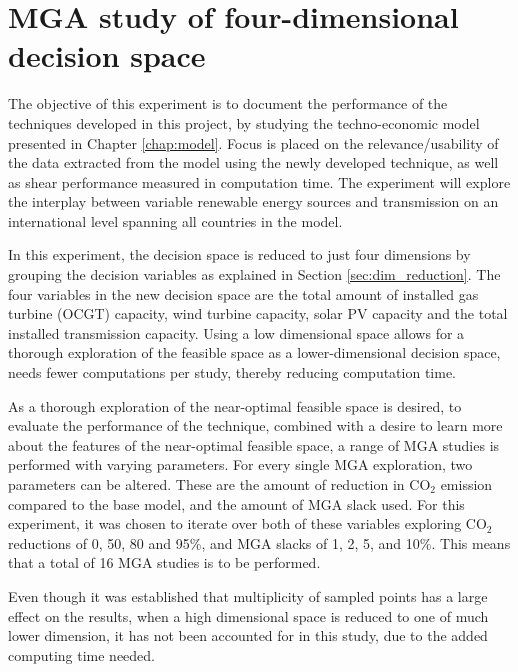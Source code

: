 \section{MGA study of four-dimensional decision space}\label{sec:4D}
The objective of this experiment is to document the performance of the techniques developed in this project, by studying the techno-economic model presented in Chapter \ref{chap:model}. Focus is placed on the relevance/usability of the data extracted from the model using the newly developed technique, as well as shear performance measured in computation time. The experiment will explore the interplay between variable renewable energy sources and transmission on an international level spanning all countries in the model. 

In this experiment, the decision space is reduced to just four dimensions by grouping the decision variables as explained in Section \ref{sec:dim_reduction}. The four variables in the new decision space are the total amount of installed gas turbine (OCGT) capacity, wind turbine capacity, solar PV capacity and the total installed transmission capacity. Using a low dimensional space allows for a thorough exploration of the feasible space as a lower-dimensional decision space, needs fewer computations per study, thereby reducing computation time. 

As a thorough exploration of the near-optimal feasible space is desired, to evaluate the performance of the technique, combined with a desire to learn more about the features of the near-optimal feasible space, a range of MGA studies is performed with varying parameters. 
For every single MGA exploration, two parameters can be altered. These are the amount of reduction in $\text{CO}_2$ emission compared to the base model, and the amount of MGA slack used. For this experiment, it was chosen to iterate over both of these variables exploring $\text{CO}_2$ reductions of 0, 50, 80 and 95\%, and MGA slacks of 1, 2, 5, and 10\%. This means that a total of 16 MGA studies is to be performed. 

Even though it was established that multiplicity of sampled points has a large effect on the results, when a high dimensional space is reduced to one of much lower dimension, it has not been accounted for in this study, due to the added computing time needed. 



